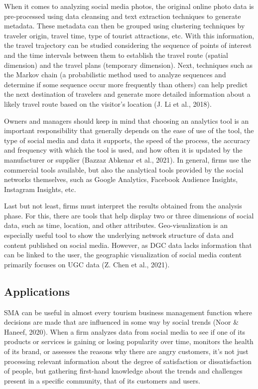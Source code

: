 \documentclass[
  letterpaper,
  DIV=11,
  numbers=noendperiod]{scrreprt}
\begin{document}
When it comes to analyzing social media photos, the original online
photo data is pre-processed using data cleansing and text extraction
techniques to generate metadata. These metadata can then be grouped
using clustering techniques by traveler origin, travel time, type of
tourist attractions, etc. With this information, the travel trajectory
can be studied considering the sequence of points of interest and the
time intervals between them to establish the travel route (spatial
dimension) and the travel plans (temporary dimension). Next, techniques
such as the Markov chain (a probabilistic method used to analyze
sequences and determine if some sequence occur more frequently than
others) can help predict the next destination of travelers and generate
more detailed information about a likely travel route based on the
visitor's location (J. Li et al., 2018).

Owners and managers should keep in mind that choosing an analytics tool
is an important responsibility that generally depends on the ease of use
of the tool, the type of social media and data it supports, the speed of
the process, the accuracy and frequency with which the tool is used, and
how often it is updated by the manufacturer or supplier (Bazzaz Abkenar
et al., 2021). In general, firms use the commercial tools available, but
also the analytical tools provided by the social networks themselves,
such as Google Analytics, Facebook Audience Insights, Instagram
Insights, etc.

Last but not least, firms must interpret the results obtained from the
analysis phase. For this, there are tools that help display two or three
dimensions of social data, such as time, location, and other attributes.
Geo-visualization is an especially useful tool to show the underlying
network structure of data and content published on social media.
However, as DGC data lacks information that can be linked to the user,
the geographic visualization of social media content primarily focuses
on UGC data (Z. Chen et al., 2021).

\hypertarget{applications}{%
\subsection{Applications}\label{applications}}

SMA can be useful in almost every tourism business management function
where decisions are made that are influenced in some way by social
trends (Noor \& Haneef, 2020). When a firm analyzes data from social
media to see if one of its products or services is gaining or losing
popularity over time, monitors the health of its brand, or assesses the
reasons why there are angry customers, it's not just processing relevant
information about the degree of satisfaction or dissatisfaction of
people, but gathering first-hand knowledge about the trends and
challenges present in a specific community, that of its customers and
users.
\end{document}
